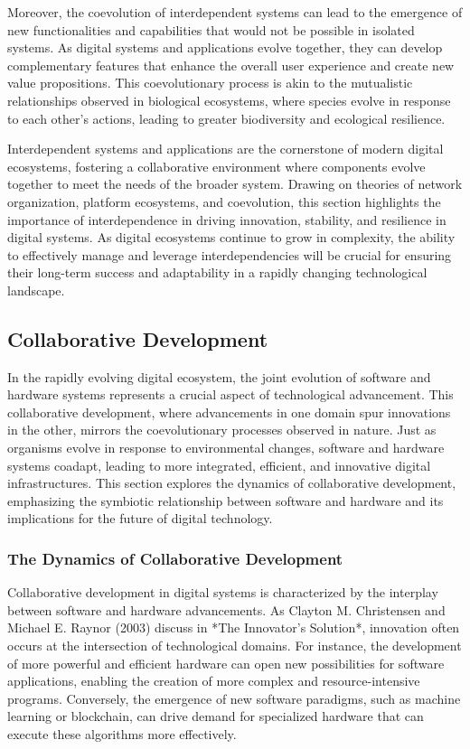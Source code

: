 \documentclass[12pt,twoside]{article}
\begin{document}
Moreover, the coevolution of interdependent systems can lead to the emergence of new functionalities and capabilities that would not be possible in isolated systems. As digital systems and applications evolve together, they can develop complementary features that enhance the overall user experience and create new value propositions. This coevolutionary process is akin to the mutualistic relationships observed in biological ecosystems, where species evolve in response to each other's actions, leading to greater biodiversity and ecological resilience.

Interdependent systems and applications are the cornerstone of modern digital ecosystems, fostering a collaborative environment where components evolve together to meet the needs of the broader system. Drawing on theories of network organization, platform ecosystems, and coevolution, this section highlights the importance of interdependence in driving innovation, stability, and resilience in digital systems. As digital ecosystems continue to grow in complexity, the ability to effectively manage and leverage interdependencies will be crucial for ensuring their long-term success and adaptability in a rapidly changing technological landscape.

\subsection{Collaborative Development}

In the rapidly evolving digital ecosystem, the joint evolution of software and hardware systems represents a crucial aspect of technological advancement. This collaborative development, where advancements in one domain spur innovations in the other, mirrors the coevolutionary processes observed in nature. Just as organisms evolve in response to environmental changes, software and hardware systems coadapt, leading to more integrated, efficient, and innovative digital infrastructures. This section explores the dynamics of collaborative development, emphasizing the symbiotic relationship between software and hardware and its implications for the future of digital technology.

\subsubsection{The Dynamics of Collaborative Development}

Collaborative development in digital systems is characterized by the interplay between software and hardware advancements. As Clayton M. Christensen and Michael E. Raynor (2003) discuss in *The Innovator's Solution*, innovation often occurs at the intersection of technological domains. For instance, the development of more powerful and efficient hardware can open new possibilities for software applications, enabling the creation of more complex and resource-intensive programs. Conversely, the emergence of new software paradigms, such as machine learning or blockchain, can drive demand for specialized hardware that can execute these algorithms more effectively.
\end{document}
